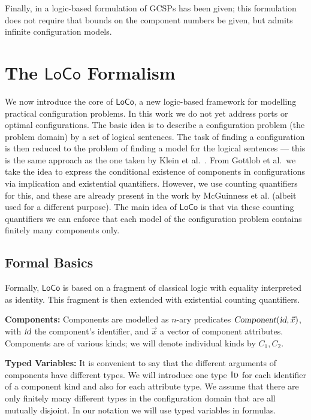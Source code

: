 \documentclass[copyright,creativecommons]{eptcs}
\newcommand{\comp}{\ensuremath{\textsl{Component}}\xspace}
\newcommand{\cid}{\ensuremath{\textsl{id}}\xspace}
\newcommand{\LoCo}{\ensuremath{\mathsf{LoCo}}\xspace}
\newcommand{\sort}[1]{\ensuremath{\text{\sc #1}}\xspace}
\begin{document}
Finally, in \cite{FriedrichStumptnerConfWS99} a logic-based formulation of GCSPs has been given; 
this formulation does not require that bounds on the component numbers be given, but admits infinite configuration models.

\section{The \LoCo Formalism}

We now introduce the core of \LoCo, a new logic-based framework for modelling practical configuration problems. 
In this work we do not yet address ports or optimal configurations.
The basic idea is to describe a configuration problem (the problem domain) by a set of logical sentences.
The task of finding a configuration is then reduced to the problem of finding a model for the logical sentences ---
this is the same approach as the one taken by Klein et al.\ \cite{DFKI-TM-95-01}.
From Gottlob et al.\ we take the idea to express the conditional existence of components in configurations via implication and existential quantifiers.
However, we use counting quantifiers for this, and these are already present in the work by McGuinness et al. (albeit used for a different purpose).
The main idea of \LoCo is that via these counting quantifiers we can enforce that each model of the configuration problem contains finitely many components only.

\subsection{Formal Basics}

Formally, \LoCo is based on a fragment of classical logic with equality interpreted as identity. 
This fragment is then extended with existential counting quantifiers.

{\noindent \bf Components\/:} Components are modelled as $n$-ary predicates $\comp(\cid,\vec x)$, with \cid the component's identifier, and $\vec x$ a vector of component attributes.
Components are of various kinds; we will denote individual kinds by $C_1, C_2$.

{\noindent \bf Typed Variables\/:} 
It is convenient to say that the different arguments of components have different types.
We will introduce one type \sort{Id} for each identifier of a component kind and also for each attribute type.
We assume that there are only finitely many different types in the configuration domain that are all mutually disjoint.
In our notation we will use typed variables in formulas.
\end{document}
